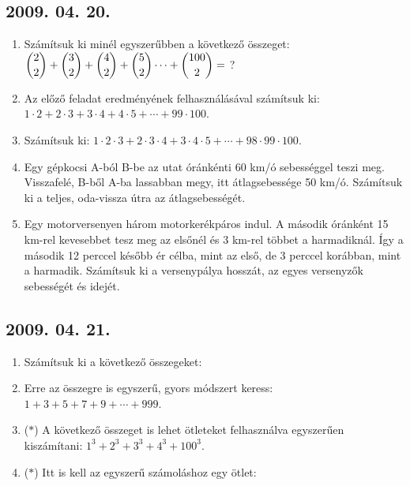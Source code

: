 \subsection*{2009. 04. 20.}
\begin{enumerate}
\item Számítsuk ki minél egyszerűbben a következő összeget:
$\dbinom{2}{2}+\dbinom{3}{2}+\dbinom{4}{2}+\dbinom{5}{2}\cdots+\dbinom{100}{2}=$ ?

\item Az előző feladat eredményének felhasználásával számítsuk ki: 
$1\cdot2+2\cdot3+3\cdot4+4\cdot5+\cdots+99\cdot100$. 

\item Számítsuk ki: 
$1\cdot2\cdot3+2\cdot3\cdot4+3\cdot4\cdot5+\cdots+98\cdot99\cdot100$.

\item Egy gépkocsi A-ból B-be az utat óránkénti 60 km/ó sebességgel teszi meg. Visszafelé, B-ből A-ba lassabban megy, itt átlagsebessége 50 km/ó. Számítsuk ki a teljes, oda-vissza útra az átlagsebességét. 

\item Egy motorversenyen három motorkerékpáros indul. A második óránként 15 km-rel kevesebbet tesz meg az elsőnél és 3 km-rel többet a harmadiknál. Így a második 12 perccel később ér célba, mint az első, de 3 perccel korábban, mint a harmadik. Számítsuk ki a versenypálya hosszát, az egyes versenyzők sebességét és idejét. 
\end{enumerate}
\subsection*{2009. 04. 21.}
\begin{enumerate}
\item Számítsuk ki a következő összegeket: 
\item Erre az összegre is egyszerű, gyors módszert keress: 
\quad $1+3+5+7+9+\cdots+999$.

\item ($*$) A következő összeget is lehet ötleteket felhasználva egyszerűen kiszámítani:
$1^3+2^3+3^3+4^3+100^3$.

\item ($*$) Itt is kell az egyszerű számoláshoz egy ötlet: 
\end{enumerate}
